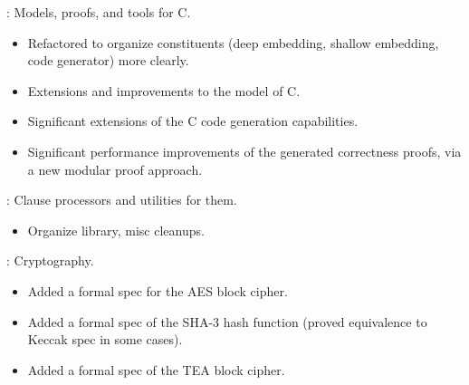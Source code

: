 \begin{frame}

\implibtitle

:
Models, proofs, and tools for C.
\begin{itemize}
\item Refactored to organize constituents
      (deep embedding, shallow embedding, code generator)
      more clearly.
\item Extensions and improvements to the model of C.
\item Significant extensions of the C code generation capabilities.
\item Significant performance improvements of the generated correctness proofs,
      via a new modular proof approach.
\end{itemize}

\end{frame}


\begin{frame}

\implibtitle

:
Clause processors and utilities for them.
\begin{itemize}
\item Organize library, misc cleanups.
\end{itemize}

\end{frame}


\begin{frame}

\implibtitle

:
Cryptography.
\begin{itemize}
\item Added a formal spec for the AES block cipher.
\item Added a formal spec of the SHA-3 hash function (proved equivalence to Keccak spec in some cases).
\item Added a formal spec of the TEA block cipher.
\end{itemize}

\end{frame}



